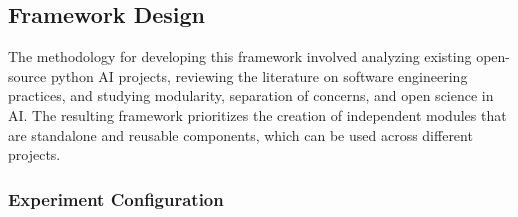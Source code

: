 


\subsection{Framework Design}

The methodology for developing this framework involved analyzing existing open-source python AI projects, reviewing the literature on software engineering practices, and studying modularity, separation of concerns, and open science in AI. The resulting framework prioritizes the creation of independent modules that are standalone and reusable components, which can be used across different projects.

\subsubsection{Experiment Configuration}

